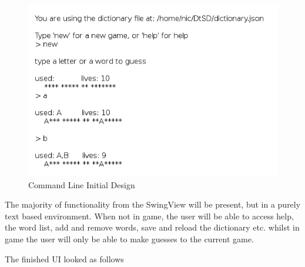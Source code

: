 \documentclass[a4paper, 11pt]{article}
\begin{document}
\begin{figure}[H]
\centering
\includegraphics[scale=0.75]{./res/CliViewDesign.png}
\caption{Command Line Initial Design}
\label{CliView}
\end{figure}

The majority of functionality from the SwingView will be present, but in a purely text based environment. When not in game, the user will be able to access help, the word list, add and remove words, save and reload the dictionary etc. whilst in game the user will only be able to make guesses to the current game.

The finished UI looked as follows
\end{document}
